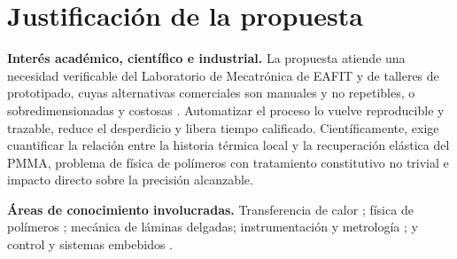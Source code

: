 \section{Justificación de la propuesta}

\noindent\textbf{Interés académico, científico e industrial.} La propuesta atiende una necesidad verificable del Laboratorio de Mecatrónica de EAFIT y de talleres de prototipado, cuyas alternativas comerciales son manuales y no repetibles, o sobredimensionadas y costosas \cite{shannon_line,mic_auto}. Automatizar el proceso lo vuelve reproducible y trazable, reduce el desperdicio y libera tiempo calificado. Científicamente, exige cuantificar la relación entre la historia térmica local y la recuperación elástica del PMMA, problema de física de polímeros con tratamiento constitutivo no trivial \cite{gilormini2010} e impacto directo sobre la precisión alcanzable.

\noindent\textbf{Áreas de conocimiento involucradas.} Transferencia de calor \cite{incropera2011}; física de polímeros \cite{osswald2012,gilormini2010,yan2023}; mecánica de láminas delgadas; instrumentación y metrología \cite{iso17025,gum2008}; y control y sistemas embebidos \cite{astrom2006}.
